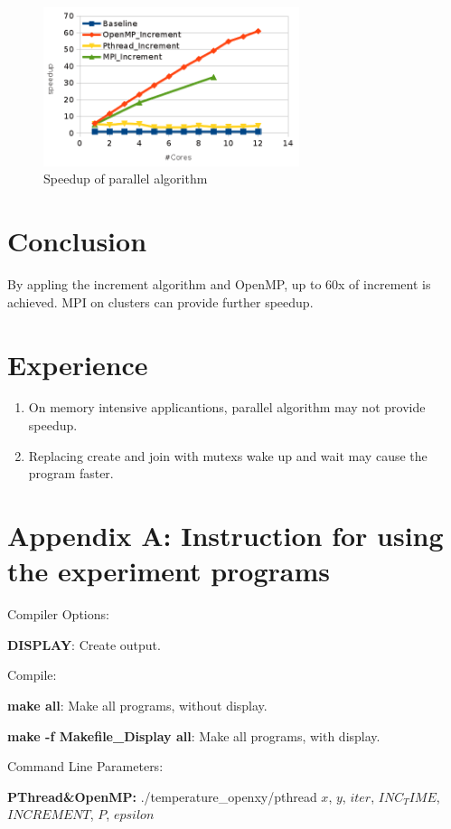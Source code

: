 \documentclass{acm_proc_article-sp}
\begin{document}
\begin{figure}[htbp]
\centering 
\includegraphics[width=7.5cm]{parallelalgspeedup.png}
\caption{Speedup of parallel algorithm}
\label{parallelalgspeedup} 
\end{figure}

\section{Conclusion}

By appling the increment algorithm and OpenMP, up to 60x of increment is achieved. MPI on clusters can provide further speedup.

\section{Experience}
\begin{enumerate}
	\item On memory intensive applicantions, parallel algorithm may not provide speedup.
	\item Replacing create and join with mutexs wake up and wait may cause the program faster.
\end{enumerate}

\section{Appendix A: Instruction for using the experiment programs}

Compiler Options: 

\textbf{DISPLAY}: Create output.

Compile:

\textbf{make all}: Make all programs, without display.

\textbf{make -f Makefile\_Display all}: Make all programs, with display.

Command Line Parameters:

\textbf{PThread\&OpenMP:} ./temperature\_openxy/pthread $x$, $y$, $iter$, $INC_TIME$, $INCREMENT$, $P$, $epsilon$
\end{document}
